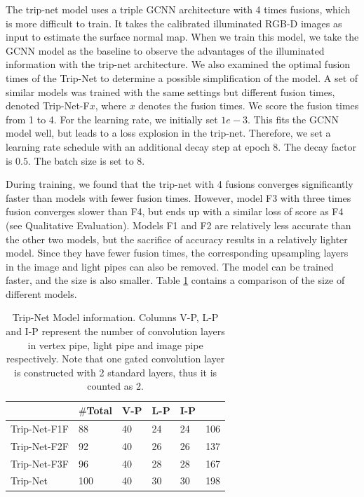 The trip-net model uses a triple GCNN architecture with 4 times fusions, which is more difficult to train. It takes the calibrated illuminated RGB-D images as input to estimate the surface normal map. When we train this model, we take the GCNN model as the baseline to observe the advantages of the illuminated information with the trip-net architecture.
We also examined the optimal fusion times of the Trip-Net to determine a possible simplification of the model. A set of similar models was trained with the same settings but different fusion times, denoted Trip-Net-F$ x $, where $ x $ denotes the fusion times. We score the fusion times from 1 to 4. For the learning rate, we initially set $ 1e-3 $. This fits the GCNN model well, but leads to a loss explosion in the trip-net. Therefore, we set a learning rate schedule with an additional decay step at epoch 8. The decay factor is $ 0.5$. The batch size is set to 8.

During training, we found that the trip-net with 4 fusions converges significantly faster than models with fewer fusion times. However, model F3 with three times fusion converges slower than F4, but ends up with a similar loss of score as F4 (see Qualitative Evaluation). Models F1 and F2 are relatively less accurate than the other two models, but the sacrifice of accuracy results in a relatively lighter model. Since they have fewer fusion times, the corresponding upsampling layers in the image and light pipes can also be removed. The model can be trained faster, and the size is also smaller. Table \ref{tab:trip-net-size-compare} contains a comparison of the size of different models.



\begin{table}[H]
	\centering
	\captionsetup{width=\linewidth}
	\begin{tabular}{l | l l l l l }
		\toprule
		\tabhead{Model} & $ \# $\textbf{Total} &\textbf{ V-P} & \textbf{L-P} & \textbf{I-P} & \tabhead{Size /MB}\\
		\midrule
		Trip-Net-F1F  			& 88 &  40 & 24 & 24 & 106\\ 
		\hline
		Trip-Net-F2F 			& 92 & 40 & 26 & 26 & 137 \\ 
		\hline
		Trip-Net-F3F 			& 96 & 40 & 28 & 28 & 167 \\
		\hline
		Trip-Net 				& 100 & 40 & 30 & 30 & 198\\
		\bottomrule
	\end{tabular}
	\caption{Trip-Net Model information. Columns V-P, L-P and I-P represent the number of convolution layers in vertex pipe, light pipe and image pipe respectively. Note that one gated convolution layer is constructed with 2 standard layers, thus it is counted as 2. }	
	\label{tab:trip-net-size-compare}
\end{table}


